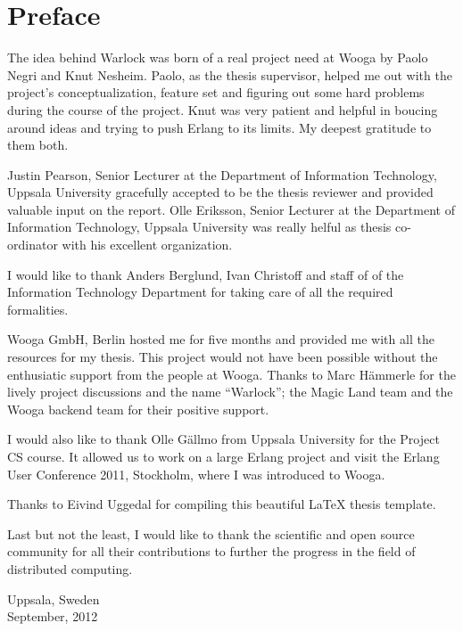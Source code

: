\chapter{Preface}

The idea behind Warlock was born of a real project need at Wooga by Paolo Negri
and Knut Nesheim. Paolo, as the thesis supervisor, helped me out with the
project's conceptualization, feature set and figuring out some hard problems
during the course of the project. Knut was very patient and helpful in boucing
around ideas and trying to push Erlang to its limits. My deepest gratitude to 
them both.

Justin Pearson, Senior Lecturer at the Department of Information Technology,
Uppsala University gracefully accepted to be the thesis reviewer and provided
valuable input on the report. Olle Eriksson, Senior Lecturer at the Department
of Information Technology, Uppsala University was really helful as thesis
co-ordinator with his excellent organization.

I would like to thank Anders Berglund, Ivan Christoff and staff of 
of the Information Technology Department for taking care of all the required 
formalities.

Wooga GmbH, Berlin hosted me for five months and provided me with all the 
resources for my thesis. This project would not have 
been possible without the enthusiatic support from the people 
at Wooga. Thanks to Marc Hämmerle for the lively project discussions and the
name ``Warlock''; the Magic Land team and the Wooga backend team for their
positive support.

I would also like to thank Olle Gällmo from Uppsala University for the
Project CS course. It allowed us to work on a large Erlang project and
visit the Erlang User Conference 2011, Stockholm, where I was
introduced to Wooga.

Thanks to Eivind Uggedal for compiling this beautiful {\LaTeX} thesis template.

Last but not the least, I would like to thank the scientific and open
source community for all their contributions to further the progress in the
field of distributed computing.\\


\raggedright{Uppsala, Sweden \\
September, 2012}

